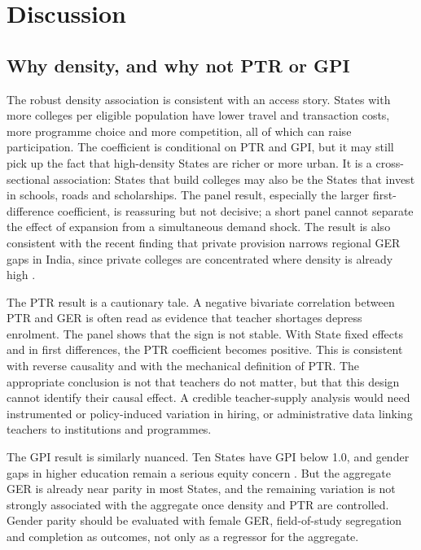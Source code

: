 \section{Discussion}\label{sec:discussion}

\subsection{Why density, and why not PTR or GPI}

The robust density association is consistent with an access story. States with more colleges per eligible population have lower travel and transaction costs, more programme choice and more competition, all of which can raise participation. The coefficient is conditional on PTR and GPI, but it may still pick up the fact that high-density States are richer or more urban. It is a cross-sectional association: States that build colleges may also be the States that invest in schools, roads and scholarships. The panel result, especially the larger first-difference coefficient, is reassuring but not decisive; a short panel cannot separate the effect of expansion from a simultaneous demand shock. The result is also consistent with the recent finding that private provision narrows regional GER gaps in India, since private colleges are concentrated where density is already high \cite{sharma2026}.

The PTR result is a cautionary tale. A negative bivariate correlation between PTR and GER is often read as evidence that teacher shortages depress enrolment. The panel shows that the sign is not stable. With State fixed effects and in first differences, the PTR coefficient becomes positive. This is consistent with reverse causality and with the mechanical definition of PTR. The appropriate conclusion is not that teachers do not matter, but that this design cannot identify their causal effect. A credible teacher-supply analysis would need instrumented or policy-induced variation in hiring, or administrative data linking teachers to institutions and programmes.

The GPI result is similarly nuanced. Ten States have GPI below 1.0, and gender gaps in higher education remain a serious equity concern \cite{ghosh2021}. But the aggregate GER is already near parity in most States, and the remaining variation is not strongly associated with the aggregate once density and PTR are controlled. Gender parity should be evaluated with female GER, field-of-study segregation and completion as outcomes, not only as a regressor for the aggregate.

